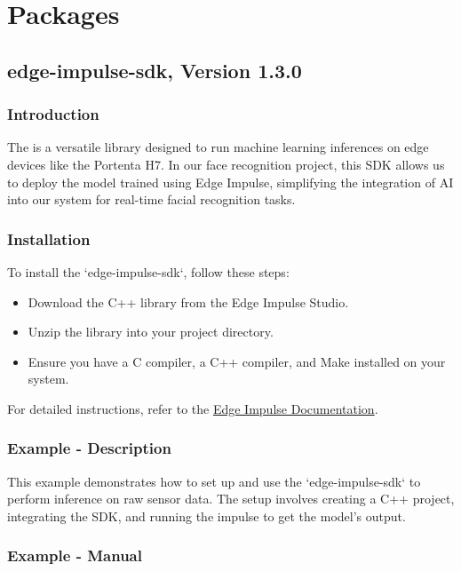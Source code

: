\chapter{Packages}
\section{edge-impulse-sdk, Version 1.3.0}
\subsection{Introduction}
The  is a versatile library designed to run machine learning inferences on edge devices like the Portenta H7. In our face recognition project, this SDK allows us to deploy the model trained using Edge Impulse, simplifying the integration of AI into our system for real-time facial recognition tasks. \cite{edgeimpulse_cpp_library:2024}

\subsection{Installation}

To install the ‘edge-impulse-sdk‘, follow these steps:
\begin{itemize}
	\item Download the C++ library from the Edge Impulse Studio.
	\item Unzip the library into your project directory.
	\item Ensure you have a C compiler, a C++ compiler, and Make installed on your system.
\end{itemize}

For detailed instructions, refer to the \href{https://docs.edgeimpulse.com/doc}{Edge Impulse Documentation}.

\subsection{Example - Description}
This example demonstrates how to set up and use the ‘edge-impulse-sdk‘ to perform inference on raw sensor data. The setup involves creating a C++ project, integrating the SDK, and running the impulse to get the model’s output.


\subsection{Example - Manual}

